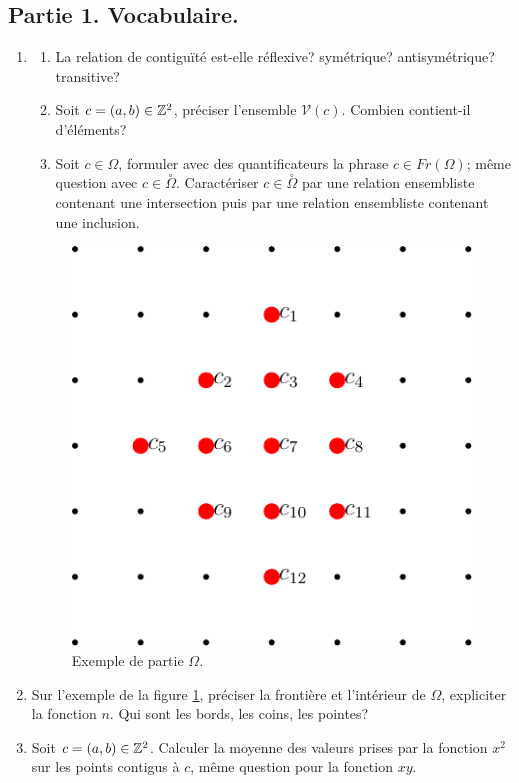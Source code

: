 \subsection*{Partie 1. Vocabulaire.}
\begin{enumerate}
  \item
\begin{enumerate}
  \item  La relation de contiguïté est-elle réflexive? symétrique? antisymétrique? transitive?
  \item Soit $c=(a,b)\in \mathbb{Z}^2$, préciser l'ensemble $\mathcal{V}(c)$. Combien contient-il d'éléments?
  \item Soit $c\in \Omega$, formuler avec des quantificateurs la phrase $c\in Fr(\Omega)$; même question avec $c\in \overset{\circ}{\Omega}$. Caractériser $c\in \overset{\circ}{\Omega}$ par une relation ensembliste contenant une intersection puis par une relation ensembliste contenant une inclusion.
\end{enumerate}
\begin{figure}[h]
  \centering
  \includegraphics{./Eharmonic_1.pdf}
  \caption{Exemple de partie $\Omega$.}
  \label{fig: harmonic_1}
\end{figure}

\item Sur l'exemple de la figure \ref{fig: harmonic_1}, préciser la frontière et l'intérieur de $\Omega$, expliciter la fonction $n$. Qui sont les bords, les coins, les pointes?

\item Soit $c=(a,b)\in \mathbb{Z}^2$. Calculer la moyenne des valeurs prises par la fonction $x^2$ sur les points contigus à $c$, même question pour la fonction $xy$.
\end{enumerate}

